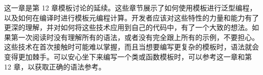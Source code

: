 这一章是第 12 章模板讨论的延续。这些章节展示了如何使用模板进行泛型编程，以及如何在编译时进行模板元编程计算。开发者应该对这些特性的力量和能力有了更深的理解，并对如何将这些技术应用到自己的代码中，有了一个大致的想法。如果第一次阅读时没有理解所有的语法，或者没有完全跟上所有的示例，不要担心。这些技术在首次接触时可能难以掌握，而且当想要编写更复杂的模板时，语法就会变得更加棘手。可以安心坐下来编写一个类或函数模板时，可以参考这一章和第 12 章，以获取正确的语法参考。
